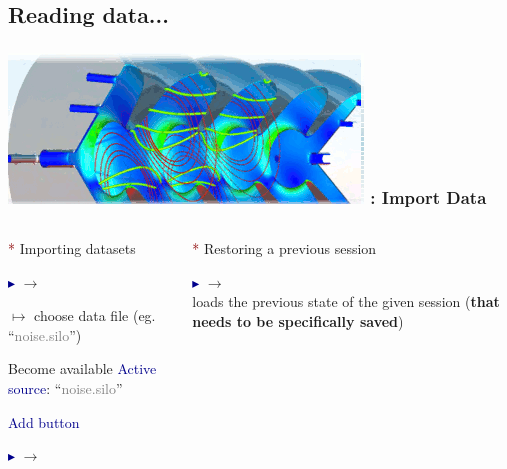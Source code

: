\subsection{Reading data...}
\begin{frame}
\frametitle{\href{https://wci.llnl.gov/simulation/computer-codes/visit/}{\includegraphics[height=.85cm]{figs/visit-logos/VisIt-02}} \hspace{-.85cm}{\bf \textcolor{lightgray}{VisIt}}: Import Data}

\begin{columns}
\begin{column}{6.25cm}
        \textcolor{DarkRed}{*} Importing datasets

        \textcolor{DarkBlue}{$\blacktriangleright$}
         $\rightarrow$ 

        \hspace{2mm} $\mapsto$ choose data file {\small (eg. ``\textcolor{gray}{noise.silo}'')}

        \pause
        \vspace{2mm}
        \begin{beamerboxesrounded}[upper=block head,lower=block body,shadow=true]{ Become available}
                \hspace{2mm}
                 \textcolor{DarkBlue}{Active source}: ``\textcolor{gray}{noise.silo}''

                \hspace{2mm}
                 \textcolor{DarkBlue}{Add button}
        \end{beamerboxesrounded}

        \pause
        \vspace{2mm}
        \textcolor{DarkBlue}{$\blacktriangleright$}
         $\rightarrow$ 
\end{column}
\begin{column}{5.5cm}
        \textcolor{DarkRed}{*} Restoring a previous session

        \vspace{2.5mm}
        \textcolor{DarkBlue}{$\blacktriangleright$}
         $\rightarrow$ 
        \\
        loads the previous state of the given session (\textbf{that needs to be specifically saved})


\end{column}
\end{columns}
\end{frame}
